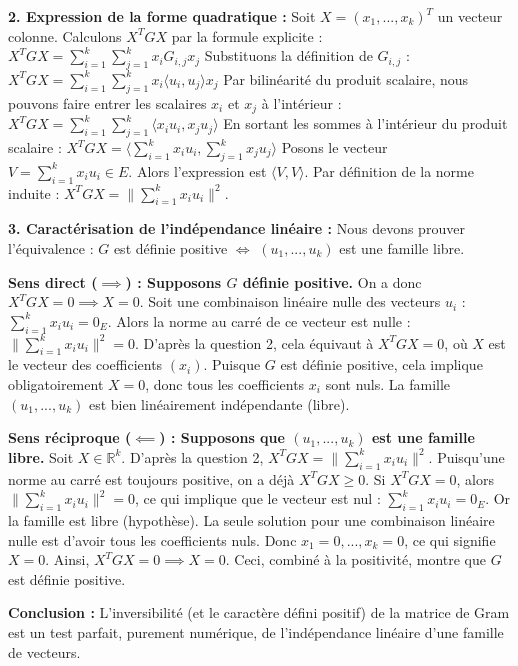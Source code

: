 \documentclass[11pt,a4paper]{report}
\begin{document}
\textbf{2. Expression de la forme quadratique :}
Soit $X = (x_1, ..., x_k)^T$ un vecteur colonne.
Calculons $X^T G X$ par la formule explicite :
$X^T G X = \sum_{i=1}^k \sum_{j=1}^k x_i G_{i,j} x_j$
Substituons la définition de $G_{i,j}$ :
$X^T G X = \sum_{i=1}^k \sum_{j=1}^k x_i \langle u_i, u_j \rangle x_j$
Par bilinéarité du produit scalaire, nous pouvons faire entrer les scalaires $x_i$ et $x_j$ à l'intérieur :
$X^T G X = \sum_{i=1}^k \sum_{j=1}^k \langle x_i u_i, x_j u_j \rangle$
En sortant les sommes à l'intérieur du produit scalaire :
$X^T G X = \langle \sum_{i=1}^k x_i u_i, \sum_{j=1}^k x_j u_j \rangle$
Posons le vecteur $V = \sum_{i=1}^k x_i u_i \in E$. Alors l'expression est $\langle V, V \rangle$.
Par définition de la norme induite :
$X^T G X = \| \sum_{i=1}^k x_i u_i \|^2$.

\textbf{3. Caractérisation de l'indépendance linéaire :}
Nous devons prouver l'équivalence : $G$ est définie positive $\iff$ $(u_1, ..., u_k)$ est une famille libre.

\textbf{Sens direct ($\implies$) : Supposons $G$ définie positive.}
On a donc $X^T G X = 0 \implies X = 0$.
Soit une combinaison linéaire nulle des vecteurs $u_i$ : $\sum_{i=1}^k x_i u_i = 0_E$.
Alors la norme au carré de ce vecteur est nulle : $\| \sum_{i=1}^k x_i u_i \|^2 = 0$.
D'après la question 2, cela équivaut à $X^T G X = 0$, où $X$ est le vecteur des coefficients $(x_i)$.
Puisque $G$ est définie positive, cela implique obligatoirement $X = 0$, donc tous les coefficients $x_i$ sont nuls.
La famille $(u_1, ..., u_k)$ est bien linéairement indépendante (libre).

\textbf{Sens réciproque ($\impliedby$) : Supposons que $(u_1, ..., u_k)$ est une famille libre.}
Soit $X \in \mathbb{R}^k$. D'après la question 2, $X^T G X = \| \sum_{i=1}^k x_i u_i \|^2$.
Puisqu'une norme au carré est toujours positive, on a déjà $X^T G X \ge 0$.
Si $X^T G X = 0$, alors $\| \sum_{i=1}^k x_i u_i \|^2 = 0$, ce qui implique que le vecteur est nul : $\sum_{i=1}^k x_i u_i = 0_E$.
Or la famille est libre (hypothèse). La seule solution pour une combinaison linéaire nulle est d'avoir tous les coefficients nuls.
Donc $x_1 = 0, ..., x_k = 0$, ce qui signifie $X = 0$.
Ainsi, $X^T G X = 0 \implies X = 0$. Ceci, combiné à la positivité, montre que $G$ est définie positive.

\textbf{Conclusion :} L'inversibilité (et le caractère défini positif) de la matrice de Gram est un test parfait, purement numérique, de l'indépendance linéaire d'une famille de vecteurs.
\end{document}
